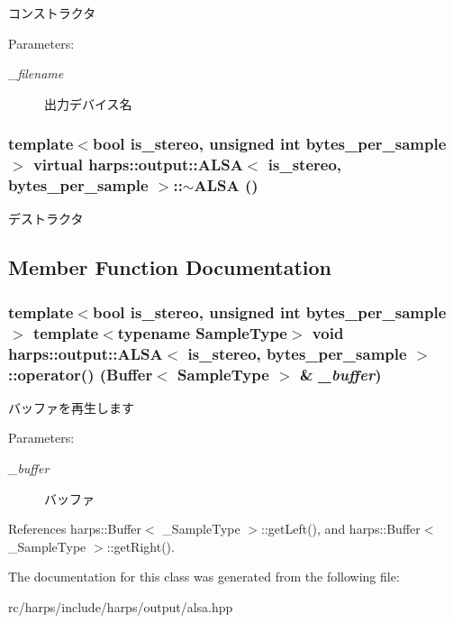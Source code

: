 コンストラクタ \begin{Desc}
\item[Parameters:]
\begin{description}
\item[{\em \_\-filename}]出力デバイス名 \end{description}
\end{Desc}
\subsubsection[$\sim$ALSA]{\setlength{\rightskip}{0pt plus 5cm}template$<$bool is\_\-stereo, unsigned int bytes\_\-per\_\-sample$>$ virtual {\bf harps::output::ALSA}$<$ is\_\-stereo, bytes\_\-per\_\-sample $>$::$\sim${\bf ALSA} ()\hspace{0.3cm}{\tt  [inline, virtual]}}\label{classharps_1_1output_1_1ALSA_6559af972d3a35b4716dde115e154a12}


デストラクタ 

\subsection{Member Function Documentation}
\subsubsection[operator()]{\setlength{\rightskip}{0pt plus 5cm}template$<$bool is\_\-stereo, unsigned int bytes\_\-per\_\-sample$>$ template$<$typename SampleType$>$ void {\bf harps::output::ALSA}$<$ is\_\-stereo, bytes\_\-per\_\-sample $>$::operator() ({\bf Buffer}$<$ SampleType $>$ \& {\em \_\-buffer})\hspace{0.3cm}{\tt  [inline]}}\label{classharps_1_1output_1_1ALSA_721e00562d78f619502336705231c930}


バッファを再生します \begin{Desc}
\item[Parameters:]
\begin{description}
\item[{\em \_\-buffer}]バッファ \end{description}
\end{Desc}


References harps::Buffer$<$ \_\-SampleType $>$::getLeft(), and harps::Buffer$<$ \_\-SampleType $>$::getRight().

The documentation for this class was generated from the following file:\begin{CompactItemize}
\item 
rc/harps/include/harps/output/alsa.hpp\end{CompactItemize}
